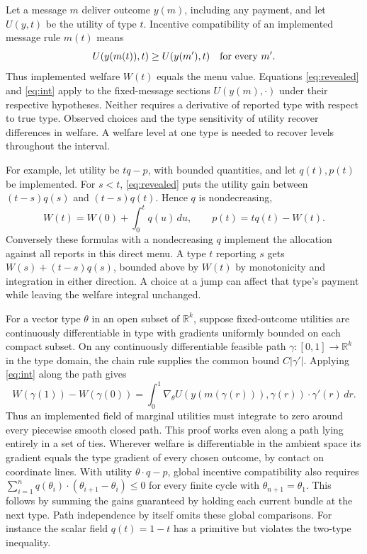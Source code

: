 \documentclass[11pt]{article}
\newcommand{\R}{\mathbb R}
\begin{document}
Let a message \(m\) deliver outcome \(y(m)\), including any payment, and let \(U(y,t)\) be the utility of type \(t\). Incentive compatibility of an implemented message rule \(m(t)\) means
\[
 U(y(m(t)),t)\geq U(y(m'),t)\quad\hbox{for every }m'.
\]
Thus implemented welfare \(W(t)\) equals the menu value. Equations \eqref{eq:revealed} and \eqref{eq:int} apply to the fixed-message sections \(U(y(m),\cdot)\) under their respective hypotheses. Neither requires a derivative of reported type with respect to true type. Observed choices and the type sensitivity of utility recover differences in welfare. A welfare level at one type is needed to recover levels throughout the interval.

For example, let utility be \(tq-p\), with bounded quantities, and let \(q(t),p(t)\) be implemented. For \(s<t\), \eqref{eq:revealed} puts the utility gain between \((t-s)q(s)\) and \((t-s)q(t)\). Hence \(q\) is nondecreasing,
\[
 W(t)=W(0)+\int_0^t q(u)\,du,\qquad p(t)=tq(t)-W(t).
\]
Conversely these formulas with a nondecreasing \(q\) implement the allocation against all reports in this direct menu. A type \(t\) reporting \(s\) gets \(W(s)+(t-s)q(s)\), bounded above by \(W(t)\) by monotonicity and integration in either direction. A choice at a jump can affect that type's payment while leaving the welfare integral unchanged.

For a vector type \(\theta\) in an open subset of \(\R^k\), suppose fixed-outcome utilities are continuously differentiable in type with gradients uniformly bounded on each compact subset. On any continuously differentiable feasible path \(\gamma:[0,1]\to\R^k\) in the type domain, the chain rule supplies the common bound \(C|\gamma'|\). Applying \eqref{eq:int} along the path gives
\[
 W(\gamma(1))-W(\gamma(0))
 =\int_0^1 \nabla_\theta U(y(m(\gamma(r))),\gamma(r))
                    \cdot\gamma'(r)\,dr .
\]
Thus an implemented field of marginal utilities must integrate to zero around every piecewise smooth closed path. This proof works even along a path lying entirely in a set of ties. Wherever welfare is differentiable in the ambient space its gradient equals the type gradient of every chosen outcome, by contact on coordinate lines. With utility \(\theta\cdot q-p\), global incentive compatibility also requires
\(\sum_{i=1}^n q(\theta_i)\cdot(\theta_{i+1}-\theta_i)\leq0\) for every finite cycle with \(\theta_{n+1}=\theta_1\). This follows by summing the gains guaranteed by holding each current bundle at the next type. Path independence by itself omits these global comparisons. For instance the scalar field \(q(t)=1-t\) has a primitive but violates the two-type inequality.
\end{document}
